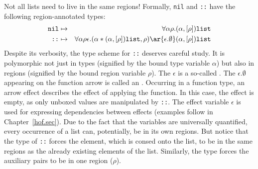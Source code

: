\documentclass[12pt]{book}
\begin{document}
Not all lists need to live in the same regions!
Formally, {\tt nil} and {\tt ::} have the following region-annotated types:
\begin{eqnarray*}
\boxml{nil} & \mapsto & \forall\alpha\rho.(\alpha,[\rho])\boxml{list}\\
\boxml{::}  & \mapsto & \forall\alpha\rho\epsilon.(\alpha\ast(\alpha,[\rho])\boxml{list},\rho)
\ar{\epsilon.\emptyset} (\alpha,[\rho])\boxml{list}
\end{eqnarray*}
Despite its verbosity, 
the type scheme for {\tt ::} deserves careful study. It is polymorphic not just in types
(signified by the bound type variable $\alpha$) but also in regions (signified by the 
bound region variable $\rho$). The $\epsilon$ is a so-called . 
The $\epsilon.\emptyset$ appearing on the function arrow is called an .
Occurring in a function type, an arrow effect describes the effect of applying the function.
In this case, the effect is empty, as only unboxed values are manipulated by {\tt ::}. The effect variable $\epsilon$ 
is used for expressing dependencies between effects (examples follow in Chapter~\ref{hof.sec}). Due to the fact that 
the variables are universally quantified, every occurrence of a list can, potentially, be in its own regions. But notice 
that the type of {\tt ::} forces the element, which is consed onto the list, to be in the same regions 
as the already existing elements of the list. Similarly, the type forces the auxiliary pairs to be in
one region ($\rho$).
\end{document}
